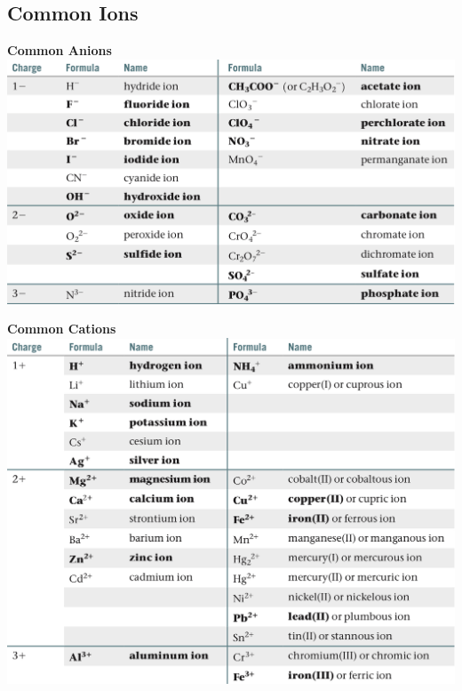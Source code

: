 \subsection{Common Ions}
\begin{minipage}{0.49 \columnwidth}
    \begin{center}
    \textbf{Common Anions}
        \includegraphics[width = \linewidth]{images/common_anions.jpeg}
    \end{center}
\end{minipage}
\begin{minipage}{0.49 \columnwidth}
    \begin{center}
    \textbf{Common Cations}
        \includegraphics[width = \linewidth]{images/common _cations.jpeg}
    \end{center}
\end{minipage}